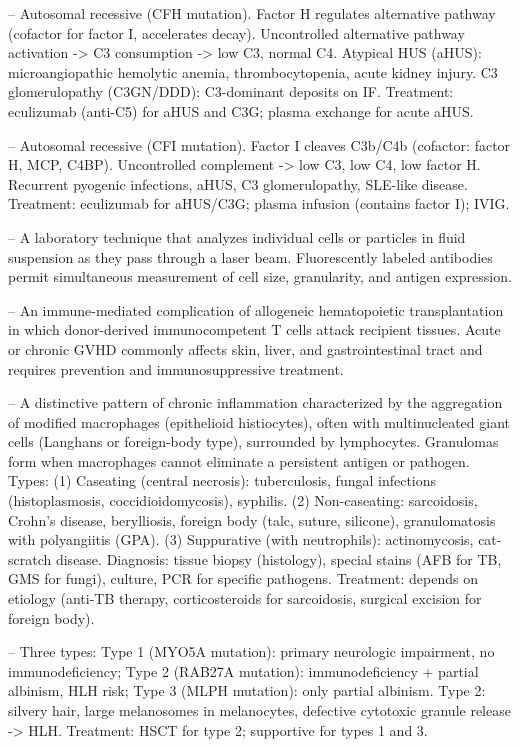 -- Autosomal recessive (CFH mutation). Factor H regulates alternative pathway (cofactor for factor I, accelerates decay). Uncontrolled alternative pathway activation -> C3 consumption -> low C3, normal C4. Atypical HUS (aHUS): microangiopathic hemolytic anemia, thrombocytopenia, acute kidney injury. C3 glomerulopathy (C3GN/DDD): C3-dominant deposits on IF. Treatment: eculizumab (anti-C5) for aHUS and C3G; plasma exchange for acute aHUS.

-- Autosomal recessive (CFI mutation). Factor I cleaves C3b/C4b (cofactor: factor H, MCP, C4BP). Uncontrolled complement -> low C3, low C4, low factor H. Recurrent pyogenic infections, aHUS, C3 glomerulopathy, SLE-like disease. Treatment: eculizumab for aHUS/C3G; plasma infusion (contains factor I); IVIG.

-- A laboratory technique that analyzes individual cells or particles in fluid suspension as they pass through a laser beam. Fluorescently labeled antibodies permit simultaneous measurement of cell size, granularity, and antigen expression.

-- An immune-mediated complication of allogeneic hematopoietic transplantation in which donor-derived immunocompetent T cells attack recipient tissues. Acute or chronic GVHD commonly affects skin, liver, and gastrointestinal tract and requires prevention and immunosuppressive treatment.

-- A distinctive pattern of chronic inflammation characterized by the aggregation of modified macrophages (epithelioid histiocytes), often with multinucleated giant cells (Langhans or foreign-body type), surrounded by lymphocytes. Granulomas form when macrophages cannot eliminate a persistent antigen or pathogen. Types: (1) Caseating (central necrosis): tuberculosis, fungal infections (histoplasmosis, coccidioidomycosis), syphilis. (2) Non-caseating: sarcoidosis, Crohn's disease, berylliosis, foreign body (talc, suture, silicone), granulomatosis with polyangiitis (GPA). (3) Suppurative (with neutrophils): actinomycosis, cat-scratch disease. Diagnosis: tissue biopsy (histology), special stains (AFB for TB, GMS for fungi), culture, PCR for specific pathogens. Treatment: depends on etiology (anti-TB therapy, corticosteroids for sarcoidosis, surgical excision for foreign body).

-- Three types: Type 1 (MYO5A mutation): primary neurologic impairment, no immunodeficiency; Type 2 (RAB27A mutation): immunodeficiency + partial albinism, HLH risk; Type 3 (MLPH mutation): only partial albinism. Type 2: silvery hair, large melanosomes in melanocytes, defective cytotoxic granule release -> HLH. Treatment: HSCT for type 2; supportive for types 1 and 3.


